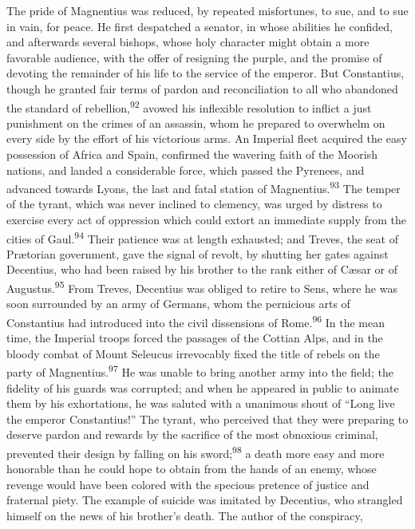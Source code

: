 The pride of Magnentius was reduced, by repeated misfortunes, to
sue, and to sue in vain, for peace. He first despatched a
senator, in whose abilities he confided, and afterwards several
bishops, whose holy character might obtain a more favorable
audience, with the offer of resigning the purple, and the promise
of devoting the remainder of his life to the service of the
emperor. But Constantius, though he granted fair terms of pardon
and reconciliation to all who abandoned the standard of
rebellion,\textsuperscript{92} avowed his inflexible resolution to inflict a just
punishment on the crimes of an assassin, whom he prepared to
overwhelm on every side by the effort of his victorious arms. An
Imperial fleet acquired the easy possession of Africa and Spain,
confirmed the wavering faith of the Moorish nations, and landed a
considerable force, which passed the Pyrenees, and advanced
towards Lyons, the last and fatal station of Magnentius.\textsuperscript{93} The
temper of the tyrant, which was never inclined to clemency, was
urged by distress to exercise every act of oppression which could
extort an immediate supply from the cities of Gaul.\textsuperscript{94} Their
patience was at length exhausted; and Treves, the seat of
Prætorian government, gave the signal of revolt, by shutting her
gates against Decentius, who had been raised by his brother to
the rank either of Cæsar or of Augustus.\textsuperscript{95} From Treves,
Decentius was obliged to retire to Sens, where he was soon
surrounded by an army of Germans, whom the pernicious arts of
Constantius had introduced into the civil dissensions of Rome.\textsuperscript{96}
In the mean time, the Imperial troops forced the passages of the
Cottian Alps, and in the bloody combat of Mount Seleucus
irrevocably fixed the title of rebels on the party of Magnentius.\textsuperscript{97}
He was unable to bring another army into the field; the
fidelity of his guards was corrupted; and when he appeared in
public to animate them by his exhortations, he was saluted with a
unanimous shout of “Long live the emperor Constantius!” The
tyrant, who perceived that they were preparing to deserve pardon
and rewards by the sacrifice of the most obnoxious criminal,
prevented their design by falling on his sword;\textsuperscript{98} a death more
easy and more honorable than he could hope to obtain from the
hands of an enemy, whose revenge would have been colored with the
specious pretence of justice and fraternal piety. The example of
suicide was imitated by Decentius, who strangled himself on the
news of his brother’s death. The author of the conspiracy,
